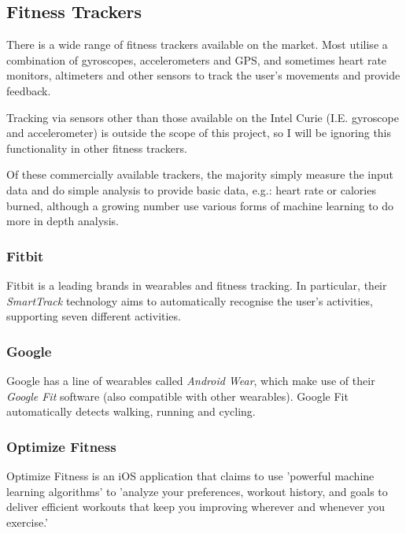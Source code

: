 \documentclass[a4paper]{article}
\begin{document}
\subsection{Fitness Trackers}%
\label{subsec:bg_fitnesstrackers}

There is a wide range of fitness trackers available on the market. Most utilise a combination of gyroscopes, accelerometers and GPS, and sometimes heart rate monitors, altimeters and other sensors to track the user's movements and provide feedback.

Tracking via sensors other than those available on the Intel Curie (I.E. gyroscope and accelerometer) is outside the scope of this project, so I will be ignoring this functionality in other fitness trackers.

Of these commercially available trackers, the majority simply measure the input data and do simple analysis to provide basic data, e.g.: heart rate or calories burned, although a growing number use various forms of machine learning to do more in depth analysis. 

\subsubsection{Fitbit}

Fitbit is a leading brands in wearables and fitness tracking. In particular, their \textit{SmartTrack}\cite{bgref8} technology aims to automatically recognise the user's activities, supporting seven different activities.

\subsubsection{Google}

Google has a line of wearables called \textit{Android Wear}\cite{bgref9}, which make use of their \textit{Google Fit}\cite{bgref10} software (also compatible with other wearables).
Google Fit automatically detects walking, running and cycling.

\subsubsection{Optimize Fitness}

Optimize Fitness\cite{bgref11} is an iOS application that claims to use 'powerful machine learning algorithms' to 'analyze your preferences, workout history, and goals to deliver efficient workouts that keep you improving wherever and whenever you exercise.'
\end{document}
